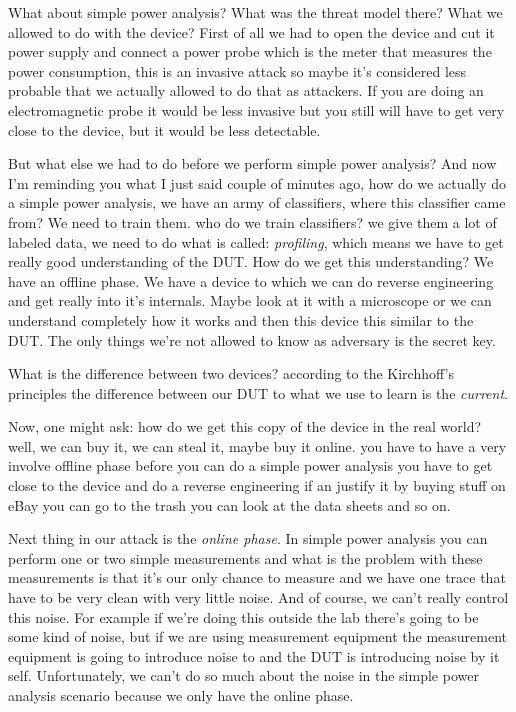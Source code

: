 What about simple power analysis? What was the threat model there? What we
allowed to do with the device? First of all we had to open the device and cut it
power supply and connect a power probe which is the meter that measures the
power consumption, this is an invasive attack so maybe it's considered less
probable that we actually allowed to do that as attackers. If you are doing an
electromagnetic probe it would be less invasive but you still will have to get
very close to the device, but it would be less detectable. 

But what else we had to do before we perform simple power analysis? And now I'm
reminding you what I just said couple of minutes ago, how do we actually do a
simple power analysis, we have an army of classifiers, where this classifier
came from? We need to train them. who do we train classifiers? we give them a
lot of labeled data, we need to do what is called: \textit{profiling}, which
means we have to get really good understanding of the DUT. How do we get this
understanding? We have an offline phase. We have a device to which we can do
reverse engineering and get really into it's internals. Maybe look at it with a
microscope or we can understand completely how it works and then this device
this similar to the DUT. The only things we're not allowed to know as adversary
is the secret key.

What is the difference between two devices? according to the Kirchhoff's
principles the difference between our DUT to what we use to learn is the
\textit{current}. 
  
Now, one might ask: how do we get this copy of the device in the real world?
well, we can buy it, we can steal it, maybe buy it online. you have to have a
very involve offline phase before you can do a simple power analysis you have to
get close to the device and do a reverse engineering if an justify it by buying
stuff on eBay you can go to the trash you can look at the data sheets and so on.

Next thing in our attack is the \textit{online phase}. In simple power analysis
you can perform one or two simple measurements and what is the problem with
these measurements  is that it's our only chance to measure and we have one
trace that have to be very clean with very little noise. And of course, we can't
really control this noise. For example if we're doing this outside the lab
there's going to be some kind of noise, but if we are using measurement
equipment the measurement equipment is going to introduce noise to and the DUT
is introducing noise by it self. Unfortunately, we can't do so much about the
noise in the simple power analysis scenario because we only have the online
phase.

